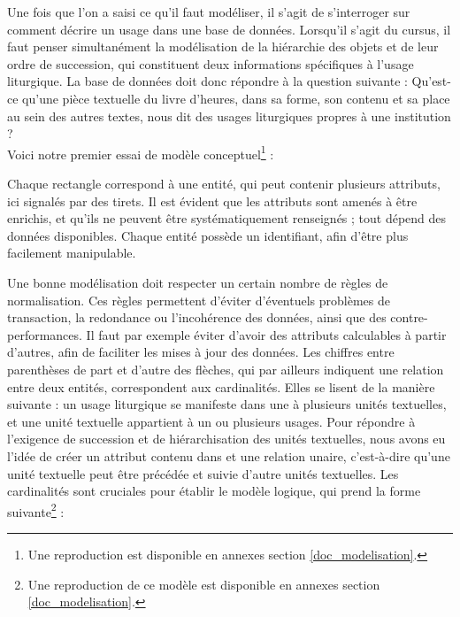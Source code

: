 \documentclass[a4paper,12pt,twoside]{book}
\begin{document}
	Une fois que l'on a saisi ce qu'il faut modéliser, il s'agit de s'interroger sur comment décrire un usage dans une base de données. Lorsqu'il s'agit du cursus, il faut penser simultanément la modélisation de la hiérarchie des objets et de leur ordre de succession, qui constituent deux informations spécifiques à l’usage liturgique. La base de données doit donc répondre à la question suivante : Qu’est-ce qu'une pièce textuelle du livre d’heures, dans sa forme, son contenu et sa place au sein des autres textes, nous dit des usages liturgiques propres à une institution ? \\
	
	Voici notre premier essai de modèle conceptuel\footnote{Une reproduction est disponible en annexes section \ref{doc_modelisation}.} : 
	
	
	Chaque rectangle correspond à une entité, qui peut contenir plusieurs attributs, ici signalés par des tirets. Il est évident que les attributs sont amenés à être enrichis, et qu'ils ne peuvent être systématiquement renseignés ; tout dépend des données disponibles. Chaque entité possède un identifiant, afin d'être plus facilement manipulable. 
	
	Une bonne modélisation doit respecter un certain nombre de règles de normalisation. Ces règles permettent d'éviter d'éventuels problèmes de transaction, la redondance ou l'incohérence des données, ainsi que des contre-performances. Il faut par exemple éviter d'avoir des attributs calculables à partir d'autres, afin de faciliter les mises à jour des données. Les chiffres entre parenthèses de part et d'autre des flèches, qui par ailleurs indiquent une relation entre deux entités, correspondent aux cardinalités. Elles se lisent de la manière suivante : un usage liturgique se manifeste dans une à plusieurs unités textuelles, et une unité textuelle appartient à un ou plusieurs usages. Pour répondre à l'exigence de succession et de hiérarchisation des unités textuelles, nous avons eu l'idée de créer un attribut \og contenu dans\fg{} et une relation unaire, c'est-à-dire qu'une unité textuelle peut être précédée et suivie d'autre unités textuelles. Les cardinalités sont cruciales pour établir le modèle logique, qui prend la forme suivante\footnote{Une reproduction de ce modèle est disponible en annexes section \ref{doc_modelisation}.} : 
\end{document}
